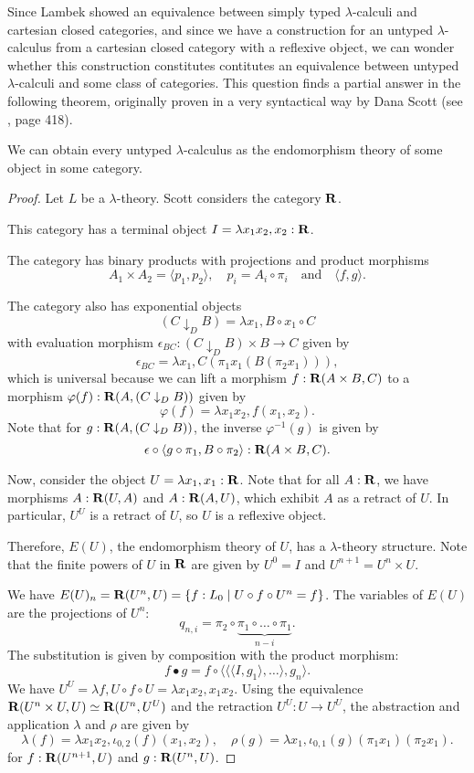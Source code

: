 Since Lambek showed an equivalence between simply typed $ \lambda $-calculi and cartesian closed categories, and since we have a construction for an untyped $ \lambda $-calculus from a cartesian closed category with a reflexive object, we can wonder whether this construction constitutes contitutes an equivalence between untyped $ \lambda $-calculi and some class of categories. This question finds a partial answer in the following theorem, originally proven in a very syntactical way by Dana Scott (see \cite{curry}, page 418).
\begin{lemma}
  We can obtain every untyped $ \lambda $-calculus as the endomorphism theory of some object in some category.
\end{lemma}
\begin{proof}
  Let $ L $ be a $ \lambda $-theory. Scott considers the category $ \mathbf{R} $.

  This category has a terminal object $ I = \lambda x_1 x_2, x_2 : \mathbf{R} $.

  The category has binary products with projections and product morphisms
  \[ A_1 \times A_2 = \langle p_1, p_2 \rangle, \quad p_i = A_i \circ \pi_i \quad \text{and} \quad \langle f, g \rangle. \]

  The category also has exponential objects
  \[ (C \downarrow_D B) = \lambda x_1, B \circ x_1 \circ C \]
  with evaluation morphism $ \epsilon_{BC}: (C \downarrow_D B) \times B \to C $ given by
  \[ \epsilon_{BC} = \lambda x_1, C(\pi_1 x_1 (B (\pi_2 x_1))), \]
  which is universal because we can lift a morphism $ f: \mathbf{R}(A \times B, C) $ to a morphism $ \varphi(f): \mathbf{R}(A, (C \downarrow_D B)) $ given by
  \[ \varphi(f) = \lambda x_1 x_2, f (x_1, x_2). \]
  Note that for $ g: \mathbf{R}(A, (C \downarrow_D B)) $, the inverse $ \varphi^{-1}(g) $ is given by
  \[ \epsilon \circ \langle g \circ \pi_1, B \circ \pi_2 \rangle: \mathbf{R}(A \times B, C). \]

  Now, consider the object $ U = \lambda x_1, x_1 : \mathbf{R} $. Note that for all $ A: \mathbf{R} $, we have morphisms $ A: \mathbf{R}(U, A) $ and $ A: \mathbf{R}(A, U) $, which exhibit $ A $ as a retract of $ U $. In particular, $ U^U $ is a retract of $ U $, so $ U $ is a reflexive object.

  Therefore, $ E(U) $, the endomorphism theory of $ U $, has a $ \lambda $-theory structure. Note that the finite powers of $ U $ in $ \mathbf{R} $ are given by $ U^0 = I $ and $ U^{n + 1} = U^n \times U $.

  We have $ E(U)_n = \mathbf{R}(U^n, U) = \{ f: L_0 \mid U \circ f \circ U^n = f \} $. The variables of $ E(U) $ are the projections of $ U^n $:
  \[ q_{n, i} = \pi_2 \circ \underbrace{\pi_1 \circ \dots \circ \pi_1}_{n - i}. \]
  The substitution is given by composition with the product morphism:
  \[ f \bullet g = f \circ \langle \langle \langle I, g_1 \rangle, \dots \rangle, g_n \rangle. \]
  We have $ U^U = \lambda f, U \circ f \circ U = \lambda x_1 x_2, x_1 x_2 $. Using the equivalence $ \mathbf{R}(U^n \times U, U) \simeq \mathbf{R}(U^n, U^U) $ and the retraction $ U^U: U \to U^U $, the abstraction and application $ \lambda $ and $ \rho $ are given by
  \[ \lambda(f) = \lambda x_1 x_2, \iota_{0, 2}(f)(x_1, x_2), \quad \rho(g) = \lambda x_1, \iota_{0, 1}(g) (\pi_1 x_1) (\pi_2 x_1). \]
  for $ f: \mathbf{R}(U^{n + 1}, U) $ and $ g: \mathbf{R}(U^n, U) $.


\end{proof}
